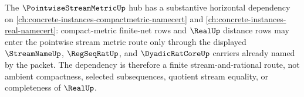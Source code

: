 The $\PointwiseStreamMetricUp$ hub has a substantive horizontal dependency on \autoref{ch:concrete-instances-compactmetric-namecert} and \autoref{ch:concrete-instances-real-namecert}: compact-metric finite-net rows and $\RealUp$ distance rows may enter the pointwise stream metric route only through the displayed $\StreamNameUp$, $\RegSeqRatUp$, and $\DyadicRatCoreUp$ carriers already named by the packet. The dependency is therefore a finite stream-and-rational route, not ambient compactness, selected subsequences, quotient stream equality, or completeness of $\RealUp$.

